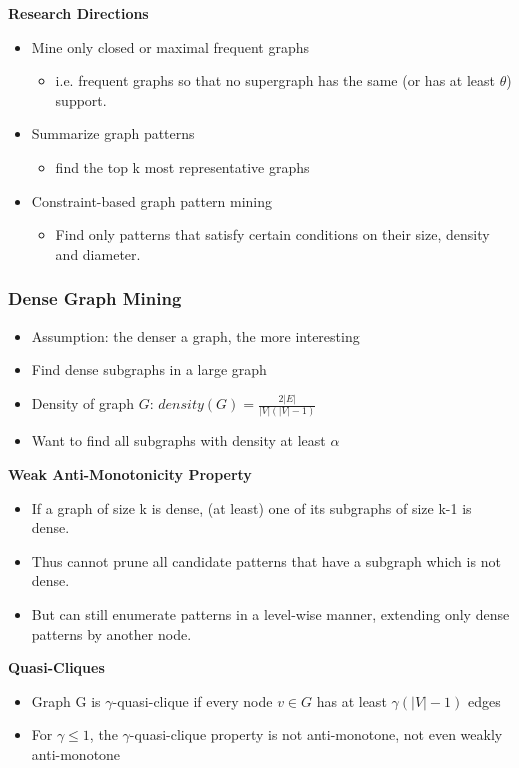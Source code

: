 \documentclass[../notes.tex]{subfiles}
\begin{document}
\textbf{Research Directions}
\begin{itemize}
  \item Mine only closed or maximal frequent graphs
  \begin{itemize}
    \item i.e. frequent graphs so that no supergraph has the same (or has at least $\theta$) support.
  \end{itemize}

  \item Summarize graph patterns
  \begin{itemize}
    \item find the top k most representative graphs
  \end{itemize}

  \item Constraint-based graph pattern mining
  \begin{itemize}
    \item Find only patterns that satisfy certain conditions on their size, density and diameter. 
  \end{itemize}
\end{itemize}

\subsubsection{Dense Graph Mining}
\begin{itemize}
  \item Assumption: the denser a graph, the more interesting
  \item Find dense subgraphs in a large graph
  \item Density of graph $G$: $density(G) = \frac{2|E|}{|V|(|V|-1)}$
  \item Want to find all subgraphs with density at least $\alpha$
\end{itemize}

\textbf{Weak Anti-Monotonicity Property}
\begin{itemize}
  \item If a graph of size k is dense, (at least) one of its subgraphs of size k-1 is dense.
  \item Thus cannot prune all candidate patterns that have a subgraph which is not dense.
  \item But can still enumerate patterns in a level-wise manner, extending only dense patterns by another node.
\end{itemize}

\textbf{Quasi-Cliques}
\begin{itemize}
  \item Graph G is $\gamma$-quasi-clique if every node $v \in G$ has at least $\gamma(|V|-1)$ edges
  \item For $\gamma \le 1$, the $\gamma$-quasi-clique property is not anti-monotone, not even weakly anti-monotone
\end{itemize}
\end{document}
